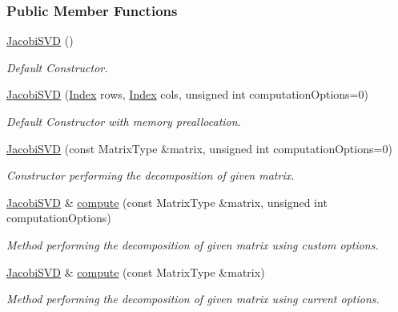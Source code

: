 \subsubsection*{Public Member Functions}
\begin{DoxyCompactItemize}
\item 
\hyperlink{group___s_v_d___module_a55315ab9cd060019a5ad07be798ff3b9}{Jacobi\+S\+VD} ()
\begin{DoxyCompactList}\small\item\em Default Constructor. \end{DoxyCompactList}\item 
\hyperlink{group___s_v_d___module_a5d9ea7c8f361337727260efd77ee03ac}{Jacobi\+S\+VD} (\hyperlink{group___s_v_d___module_a6229a37997eca1072b52cca5ee7a2bec}{Index} rows, \hyperlink{group___s_v_d___module_a6229a37997eca1072b52cca5ee7a2bec}{Index} cols, unsigned int computation\+Options=0)
\begin{DoxyCompactList}\small\item\em Default Constructor with memory preallocation. \end{DoxyCompactList}\item 
\hyperlink{group___s_v_d___module_abfd1dd454a6e3edec7feecd97c818a78}{Jacobi\+S\+VD} (const Matrix\+Type \&matrix, unsigned int computation\+Options=0)
\begin{DoxyCompactList}\small\item\em Constructor performing the decomposition of given matrix. \end{DoxyCompactList}\item 
\hyperlink{group___s_v_d___module_class_eigen_1_1_jacobi_s_v_d}{Jacobi\+S\+VD} \& \hyperlink{group___s_v_d___module_a5dab376cc86cf0d36674bcdad4af3f5a}{compute} (const Matrix\+Type \&matrix, unsigned int computation\+Options)
\begin{DoxyCompactList}\small\item\em Method performing the decomposition of given matrix using custom options. \end{DoxyCompactList}\item 
\hyperlink{group___s_v_d___module_class_eigen_1_1_jacobi_s_v_d}{Jacobi\+S\+VD} \& \hyperlink{group___s_v_d___module_acc7b9a4068cf7b69ae3227d217ed7efd}{compute} (const Matrix\+Type \&matrix)
\begin{DoxyCompactList}\small\item\em Method performing the decomposition of given matrix using current options. \end{DoxyCompactList}\item 

\end{DoxyCompactItemize}
